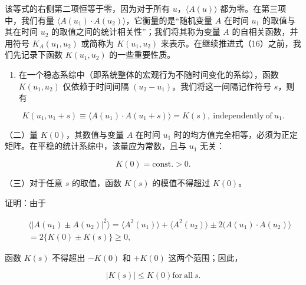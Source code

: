 该等式的右侧第二项恒等于零，因为对于所有 \(u\)，\(\langle A(u)\rangle\) 都为零。在第三项中，我们有量 \(\langle A(u_1)\cdot A(u_2)\rangle\)，它衡量的是``随机变量 \(A\) 在时间 \(u_1\) 的取值与其在时间 \(u_2\) 的取值之间的统计相关性''；我们将其称为变量 \(A\) 的自相关函数，并用符号 \(K_A(u_1,u_2)\) 或简称为 \(K(u_1,u_2)\) 来表示。在继续推进式（16）之前，我们先记录下函数 \(K(u_1,u_2)\) 的一些重要性质。

\begin{enumerate}
\def\labelenumi{(\roman{enumi})}
\tightlist
\item
  在一个稳态系综中（即系统整体的宏观行为不随时间变化的系综），函数 \(K(u_1, u_2)\) 仅依赖于时间间隔 \((u_2 - u_1)\)。我们将这一间隔记作符号 \(s\)，则有
\end{enumerate}

\begin{equation}\tag{15.3.17}\label{eq:15.3.17}
K ( u _ { 1 } , u _ { 1 } + s ) \equiv \langle A ( u _ { 1 } ) \cdot A ( u _ { 1 } + s ) \rangle = K ( s ) , \mathrm { ~ i n d e p e n d e n t l y ~ o f ~ } u _ { 1 } .
\end{equation}

（二）量 \(K(0)\)，其数值与变量 \(A\) 在时间 \(u_1\) 时的均方值完全相等，必须为正定矩阵。在平稳的统计系综中，该量应为常数，且与 \(u_1\) 无关：

\begin{equation}\tag{15.3.18}\label{eq:15.3.18}
K ( 0 ) = \mathrm { c o n s t . } > 0 .
\end{equation}

（三）对于任意 \(s\) 的取值，函数 \(K(s)\) 的模值不得超过 \(K(0)\)。

证明：由于

\begin{equation}\tag{15.3.19}\label{eq:15.3.19}
\begin{array}{rlr} & { } & { \langle | A ( u _ { 1 } ) \pm A ( u _ { 2 } ) | ^{2} \rangle = \langle A ^{2} ( u _ { 1 } ) \rangle + \langle A ^{2} ( u _ { 2 } ) \rangle \pm 2 ( A ( u _ { 1 } ) \cdot A ( u _ { 2 } ) \rangle } \\& { } & { = 2 \{ K ( 0 ) \pm K ( s ) \} \geq 0 , } \end{array}
\end{equation}

函数 \(K(s)\) 不得超出 \(-K(0)\) 和 \(+K(0)\) 这两个范围；因此，

\begin{equation}\tag{15.3.20}\label{eq:15.3.20}
| K ( s ) | \leq K ( 0 )  { \mathrm { f o r ~ a l l ~ } } s .
\end{equation}

